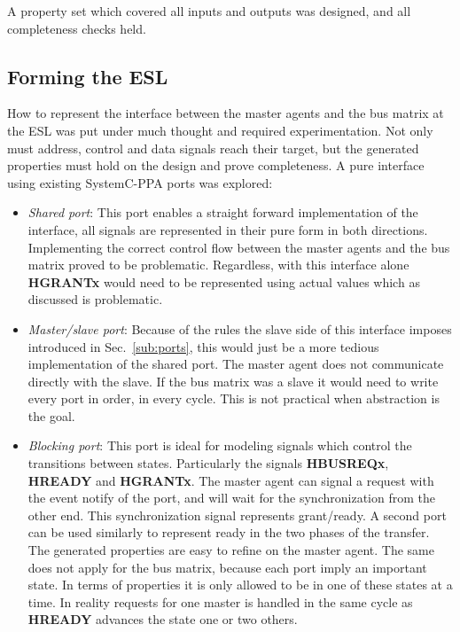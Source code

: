 A property set which covered all inputs and outputs was designed, and all completeness checks held.  

\subsection{Forming the ESL}
How to represent the interface between the master agents and the bus matrix at the ESL was put under much thought and required experimentation. Not only must address, control and data signals reach their target, but the generated properties must hold on the design and prove completeness. A pure interface using existing SystemC-PPA ports was explored: 
\begin{itemize}
  \item \textit{Shared port}: This port enables a straight forward implementation of the interface, all signals are represented in their pure form in both directions. Implementing the correct control flow between the master agents and the bus matrix proved to be problematic. Regardless, with this interface alone
\textbf{HGRANTx} would need to be represented using actual values which as discussed is problematic.  
 \item \textit{Master/slave port}: Because of the rules the slave side of this interface imposes introduced in Sec.~\ref{sub:ports}, this would just be a more tedious implementation of the shared port. The master agent does not communicate directly with the slave. If the bus matrix was a slave it would need to write every port in order, in every cycle. This is not practical when abstraction is the goal. 
 \item \textit{Blocking port}: This port is ideal for modeling signals which control the transitions between states. Particularly the signals \textbf{HBUSREQx}, 
\textbf{HREADY} and \textbf{HGRANTx}. The master agent can signal a request with the event notify of the port, and will wait for the synchronization from the other end. This synchronization signal represents grant/ready. A second port can be used similarly to represent ready in the two phases of the transfer. The generated properties are easy to refine on the master agent. The same does not apply for the bus matrix, because each port imply an important state. In terms of properties it is only allowed to be in one of these states at a time. In reality requests for one master is handled in the same cycle as \textbf{HREADY} advances the state one or two others.  
\end{itemize}

